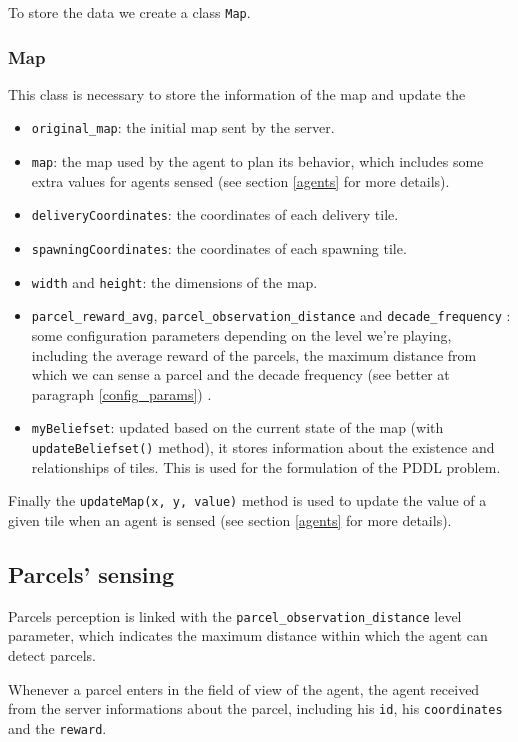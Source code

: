 \documentclass[10pt]{article}
\begin{document}
To store the data we create a class \texttt{Map}.

\subsubsection{Map}
This class is necessary to store the information of the map and update the 

\begin{itemize}
    \item \texttt{original\_map}: the initial map sent by the server.
    \item \texttt{map}: the map used by the agent to plan its behavior, which includes some extra values for agents sensed (see section \ref{agents} for more details).
    \item \texttt{deliveryCoordinates}: the coordinates of each delivery tile.
    \item \texttt{spawningCoordinates}: the coordinates of each spawning tile.
    \item \texttt{width} and \texttt{height}: the dimensions of the map.
    \item \texttt{parcel\_reward\_avg}, \texttt{parcel\_observation\_distance} and \texttt{decade\_frequency} : some configuration parameters depending on the level we're playing, including the average reward of the parcels, the maximum distance from which we can sense a parcel and the decade frequency (see better at paragraph \ref{config_params}) .
    \item \texttt{myBeliefset}: updated based on the current state of the map (with \texttt{updateBeliefset()} method), it stores information about the existence and relationships of tiles. This is used for the formulation of the PDDL problem.
\end{itemize}

Finally the \texttt{updateMap(x, y, value)} method is used to update the value of a given tile when an agent is sensed (see section \ref{agents} for more details).

\subsection{Parcels' sensing}

Parcels perception is linked with the \texttt{parcel\_observation\_distance} level parameter, which indicates the maximum distance within which the agent can detect parcels. 

Whenever a parcel enters in the field of view of the agent, the agent received from the server informations about the parcel, including his \texttt{id}, his \texttt{coordinates} and the \texttt{reward}.    
\end{document}
